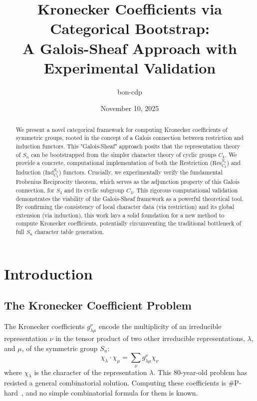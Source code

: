 \documentclass[11pt]{article}
\title{Kronecker Coefficients via Categorical Bootstrap: \\ A Galois-Sheaf Approach with Experimental Validation}
\author[1]{bon-cdp}
\affil[1]{\texttt{shakilflynn@gmail.com}}
\date{November 10, 2025}
\theoremstyle{definition}
\theoremstyle{remark}
\begin{document}
\maketitle

\begin{abstract}
We present a novel categorical framework for computing Kronecker coefficients of symmetric groups, rooted in the concept of a Galois connection between restriction and induction functors. This "Galois-Sheaf" approach posits that the representation theory of $S_n$ can be bootstrapped from the simpler character theory of cyclic groups $C_k$. We provide a concrete, computational implementation of both the Restriction ($\text{Res}^{S_n}_{C_k}$) and Induction ($\text{Ind}_{C_k}^{S_n}$) functors. Crucially, we experimentally verify the fundamental Frobenius Reciprocity theorem, which serves as the adjunction property of this Galois connection, for $S_4$ and its cyclic subgroup $C_4$. This rigorous computational validation demonstrates the viability of the Galois-Sheaf framework as a powerful theoretical tool. By confirming the consistency of local character data (via restriction) and its global extension (via induction), this work lays a solid foundation for a new method to compute Kronecker coefficients, potentially circumventing the traditional bottleneck of full $S_n$ character table generation.
\end{abstract}

\section{Introduction}

\subsection{The Kronecker Coefficient Problem}

The Kronecker coefficients $g^\nu_{\lambda\mu}$ encode the multiplicity of an irreducible representation $\nu$ in the tensor product of two other irreducible representations, $\lambda$, and $\mu$, of the symmetric group $S_n$:
\begin{equation}
\chi_\lambda \cdot \chi_\mu = \sum_\nu g^\nu_{\lambda\mu} \chi_\nu
\end{equation}
where $\chi_\lambda$ is the character of the representation $\lambda$. This 80-year-old problem has resisted a general combinatorial solution. Computing these coefficients is \#P-hard~\cite{pak2023}, and no simple combinatorial formula for them is known.
\end{document}
